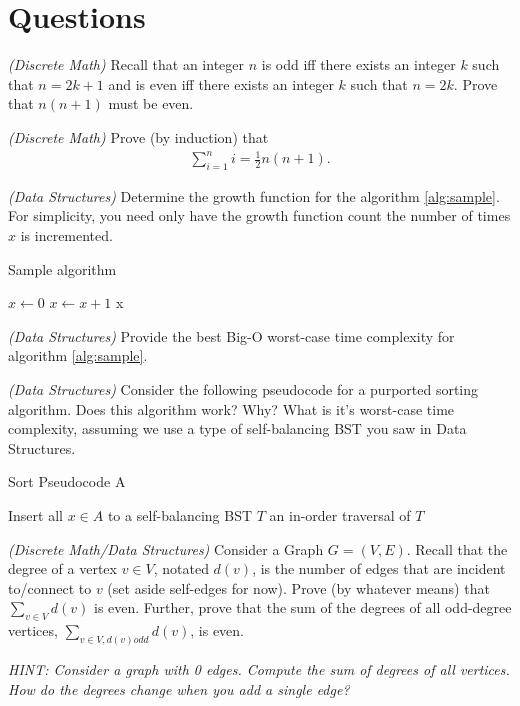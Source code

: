 \documentclass{exam}
\begin{document}
\section*{Questions}
\begin{questions}
    \question \textit{(Discrete Math)} Recall that an integer $n$ is odd iff there exists an integer $k$ such that $n = 2k + 1$ and is even iff there exists an integer $k$ such that $n = 2k$. Prove that $n(n+1)$ must be even. 
    
    \question \textit{(Discrete Math)} Prove (by induction) that 
    \begin{align*}
        \sum_{i = 1}^n i = \frac{1}{2}n(n+1).
    \end{align*}

    \question \textit{(Data Structures)} Determine the growth function for the algorithm \ref{alg:sample}. For simplicity, you need only have the growth function count the number of times $x$ is incremented. 

        \begin{algorithm}
        \caption{Sample algorithm}
        \label{alg:sample}
        \begin{algorithmic}
            \State $x \gets 0$
                    \State $x \gets x + 1$
                \EndFor
            \EndFor
            \State \Return x
        \end{algorithmic}
    \end{algorithm}

    \question \textit{(Data Structures)} Provide the best Big-O worst-case time complexity for algorithm \ref{alg:sample}. 

    \question \textit{(Data Structures)} Consider the following pseudocode for a purported sorting algorithm.
    Does this algorithm work? Why? What is it's worst-case time complexity, assuming we use a type of self-balancing BST you saw in Data Structures. 

    \begin{algorithm}
        \caption{Sort Pseudocode A}
        \label{alg:bsort}
        \begin{algorithmic}
            \State Insert all $x \in A$ to a self-balancing BST $T$
            \State \Return an in-order traversal of $T$
        \EndFunction
        \end{algorithmic}
    \end{algorithm}

    \question \textit{(Discrete Math/Data Structures)} Consider a Graph $G = (V, E)$. Recall that the degree of a vertex $v \in V$, notated $d(v)$, is the number of edges that are incident to/connect to $v$ (set aside self-edges for now). Prove (by whatever means) that $\sum_{v \in V} d(v)$ is even. Further, prove that the sum of the degrees of all odd-degree vertices, $\sum_{v \in V, d(v) odd} d(v)$, is even.

    \textit{HINT: Consider a graph with 0 edges. Compute the sum of degrees of all vertices. How do the degrees change when you add a single edge?}
\end{questions}
\end{document}
